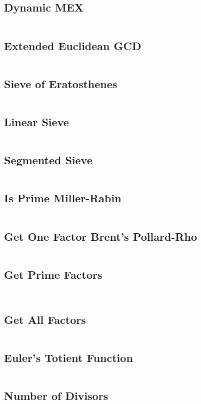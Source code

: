 \documentclass[a4paper, 8pt, landscape, oneside]{extarticle}
\begin{document}
\begin{multicols*}{3}
    	\subsection{Dynamic MEX}
    	\inputminted{cpp}{src/math/dynmex.cpp}
    	\subsection{Extended Euclidean GCD}
    	\inputminted{cpp}{src/math/02-exgcd.hpp}
    	\subsection{Sieve of Eratosthenes}
    	\inputminted{cpp}{src/math/03-sieveoferath.hpp}
    	\subsection{Linear Sieve}
    	\inputminted{cpp}{src/math/04-linearsieve.hpp}
    	\subsection{Segmented Sieve}
    	\inputminted{cpp}{src/math/segmentedsieve.hpp}
    	\subsection{Is Prime Miller-Rabin}
    	\inputminted{cpp}{src/math/05-isprimemr.hpp}
    	\subsection{Get One Factor Brent's Pollard-Rho}
    	\inputminted{cpp}{src/math/07-getonefacbpr.hpp}
    	\subsection{Get Prime Factors}
    	\inputminted{cpp}{src/math/06-getprimefacslow.hpp}
    	\inputminted{cpp}{src/math/08-getprimefacfast.hpp}
    	\subsection{Get All Factors}
    	\inputminted{cpp}{src/math/09-getallfac.hpp}
    	\subsection{Euler's Totient Function}
    	\inputminted{cpp}{src/math/10-getphi.hpp}
    	\subsection{Number of Divisors}
    	\inputminted{cpp}{src/math/11-getnumdiv.hpp}

\end{multicols*}
\end{document}
